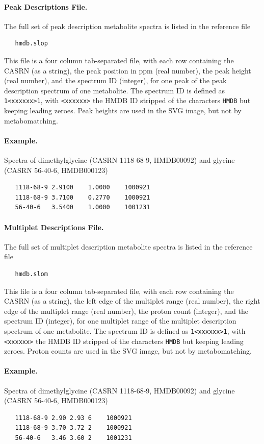 \documentclass[a4paper,11pt]{article}
\begin{document}
\paragraph{Peak Descriptions File.} The full set of peak description metabolite spectra is listed in the reference file
\begin{verbatim}
   hmdb.slop
\end{verbatim}
This file is a four column tab-separated file, with each row containing the CASRN (as a string), the peak position in ppm (real number), the peak height (real number), and the spectrum ID (integer), for one peak of the peak description spectrum of one metabolite. The spectrum ID is defined as \verb|1<xxxxxx>1|, with \verb|<xxxxxx>| the HMDB ID stripped of the characters \verb|HMDB| but keeping leading zeroes. Peak heights are used in the SVG image, but not by metabomatching.
\paragraph{Example.} Spectra of dimethylglycine (CASRN 1118-68-9, HMDB00092) and glycine (CASRN 56-40-6, HMDB000123)
\begin{verbatim}
   1118-68-9 2.9100    1.0000    1000921
   1118-68-9 3.7100    0.2770    1000921
   56-40-6   3.5400    1.0000    1001231
\end{verbatim}

\paragraph{Multiplet Descriptions File.} The full set of multiplet description metabolite spectra is listed in the reference file
\begin{verbatim}
   hmdb.slom
\end{verbatim}
This file is a four column tab-separated file, with each row containing the CASRN (as a string), the left edge of the multiplet range (real number),  the right edge of the multiplet range (real number), the proton count (integer), and the spectrum ID (integer), for one multiplet range of the multiplet description spectrum of one metabolite. The spectrum ID is defined as \verb|1<xxxxxx>1|, with \verb|<xxxxxx>| the HMDB ID stripped of the characters \verb|HMDB| but keeping leading zeroes. Proton counts are used in the SVG image, but not by metabomatching.
\paragraph{Example.} Spectra of dimethylglycine (CASRN 1118-68-9, HMDB00092) and glycine (CASRN 56-40-6, HMDB000123)
\begin{verbatim}
   1118-68-9 2.90 2.93 6    1000921
   1118-68-9 3.70 3.72 2    1000921
   56-40-6   3.46 3.60 2    1001231
\end{verbatim}
\end{document}
